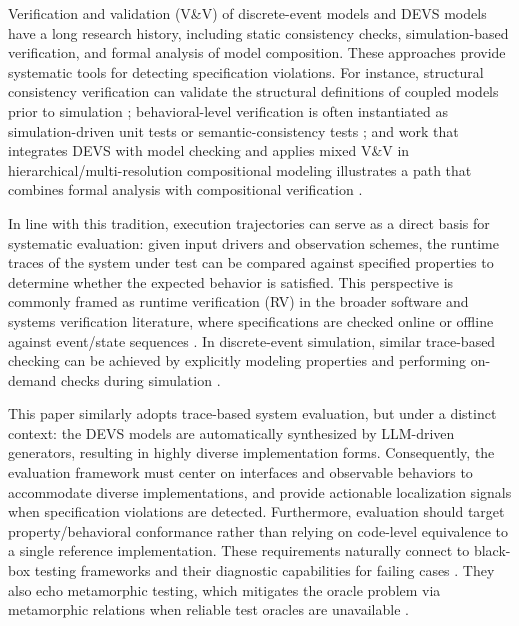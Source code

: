 


Verification and validation (V\&V) of discrete-event models and DEVS models have a long research history, including static consistency checks, simulation-based verification, and formal analysis of model composition. These approaches provide systematic tools for detecting specification violations. For instance, structural consistency verification can validate the structural definitions of coupled models prior to simulation \cite{lee2025devs_struct_verify}; behavioral-level verification is often instantiated as simulation-driven unit tests or semantic-consistency tests \cite{henares2020unit_test_devs,li2011devs_testing_framework}; and work that integrates DEVS with model checking and applies mixed V\&V in hierarchical/multi-resolution compositional modeling illustrates a path that combines formal analysis with compositional verification \cite{zeigler2017devs_modelchecking,gholami2017constrained_devs_mc}.

In line with this tradition, execution trajectories can serve as a direct basis for systematic evaluation: given input drivers and observation schemes, the runtime traces of the system under test can be compared against specified properties to determine whether the expected behavior is satisfied. This perspective is commonly framed as runtime verification (RV) in the broader software and systems verification literature, where specifications are checked online or offline against event/state sequences \cite{leucker2009rv}. In discrete-event simulation, similar trace-based checking can be achieved by explicitly modeling properties and performing on-demand checks during simulation \cite{dasilva2011simulation_purposes}.

This paper similarly adopts trace-based system evaluation, but under a distinct context: the DEVS models are automatically synthesized by LLM-driven generators, resulting in highly diverse implementation forms. Consequently, the evaluation framework must center on interfaces and observable behaviors to accommodate diverse implementations, and provide actionable localization signals when specification violations are detected. Furthermore, evaluation should target property/behavioral conformance rather than relying on code-level equivalence to a single reference implementation. These requirements naturally connect to black-box testing frameworks and their diagnostic capabilities for failing cases \cite{mclaughlin2020devs_scripting}. They also echo metamorphic testing, which mitigates the oracle problem via metamorphic relations when reliable test oracles are unavailable \cite{chen1998metamorphic}.